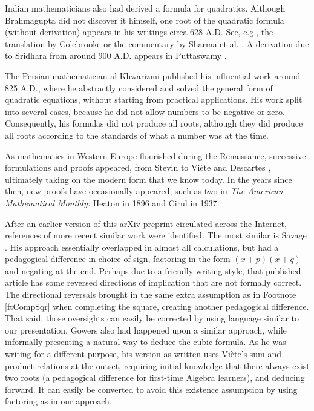 \documentclass[11pt]{article}
\begin{document}
Indian mathematicians also had derived a formula for quadratics. Although
Brahmagupta \cite{brahmagupta} did not discover it himself, one root of the
quadratic formula (without derivation) appears in his writings circa 628
A.D. See, e.g., the translation by Colebrooke \cite{colebrooke} or the
commentary by Sharma et al. \cite{sharma}. A derivation due to Sridhara
from around 900 A.D. appears in Puttaswamy \cite{puttaswamy}.

The Persian mathematician al-Khwarizmi published his influential work
\cite{al-khwarizmi} around 825 A.D., where he abstractly considered and
solved the general form of quadratic equations, without starting from
practical applications. His work split into several cases, because he did
not allow numbers to be negative or zero. Consequently, his formulas did
not produce all roots, although they did produce all roots according to the
standards of what a number was at the time.

As mathematics in Western Europe flourished during the Renaissance, successive
formulations and proofs appeared, from Stevin \cite{stevin} to Vi\`ete
\cite{viete} and Descartes \cite{descartes}, ultimately taking on the modern
form that we know today. In the years since then, new proofs have occasionally
appeared, such as two in \emph{The American Mathematical Monthly:} Heaton
\cite{heaton} in 1896 and Cirul \cite{cirul} in 1937.

After an earlier version of this arXiv preprint circulated across the Internet,
references of more recent similar work were identified. The most similar is
Savage \cite{savage}. His approach essentially overlapped in almost all
calculations, but had a pedagogical difference in choice of sign, factoring in
the form $(x+p)(x+q)$ and negating at the end. Perhaps due to a friendly writing
style, that published article has some reversed directions of implication that
are not formally correct. The directional reversals brought in the same extra
assumption as in Footnote \ref{ftCompSqr} when completing the square, creating
another pedagogical difference. That said, those oversights can easily be
corrected by using language similar to our presentation. Gowers \cite{gowers}
also had happened upon a similar approach, while informally presenting a natural
way to deduce the cubic formula.  As he was writing for a different purpose, his
version as written uses Vi\`ete's sum and product relations at the outset,
requiring initial knowledge that there always exist two roots (a pedagogical
difference for first-time Algebra learners), and deducing forward. It can easily
be converted to avoid this existence assumption by using factoring as in our
approach. 
\end{document}
